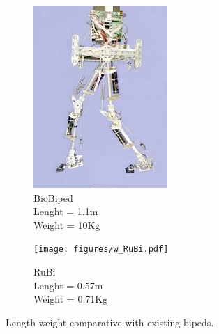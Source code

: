 \begin{figure}[htb]
\begin{subfigure}{.22\textwidth}
    \includegraphics[width=\linewidth]{figures/w_biobiped.jpg}
    \caption{BioBiped\\
    Lenght = 1.1m\\
    Weight = 10Kg}
    \label{fig:w_biobiped}
  \end{subfigure}
  \begin{subfigure}{.22\textwidth}
    \texttt{[image: figures/w\_RuBi.pdf]}
    \caption{RuBi\\
    Lenght = 0.57m\\
    Weight = 0.71Kg}
    \label{fig:w_rubi}
  \end{subfigure}
  \caption{Length-weight comparative with existing bipeds.}
  \label{fig:bipedal_robots}
\end{figure}  


